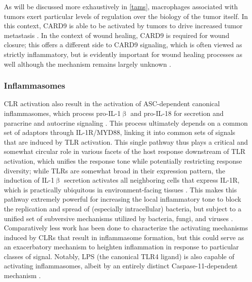 As will be discussed more exhaustively in \autoref{tams}, macrophages associated with tumors exert particular levels of regulation over the biology of the tumor itself. In this context, CARD9 is able to be activated by tumors to drive increased tumor metastasis \citep{Yang2014b}. In the context of wound healing, CARD9 is required for wound closure; this offers a different side to CARD9 signaling, which is often viewed as strictly inflammatory, but is evidently important for wound healing processes as well although the mechanism remains largely unknown \citep{Kanno2017}.

\subsubsection{Inflammasomes}\label{clr:asc}

CLR activation also result in the activation of ASC\hyp{}dependent canonical inflammasomes, which process pro\hyp{}IL\hyp{}1$\upbeta$ and pro\hyp{}IL\hyp{}18 for secretion and paracrine and autocrine signaling \citep{Gross2011}. This process ultimately depends on a common set of adaptors through IL\hyp{}1R/MYD88, linking it into common sets of signals that are induced by TLR activation. This single pathway thus plays a critical and somewhat circular role in various facets of the host response downstream of TLR activation, which unifies the response tone while potentially restricting response diversity; while TLRs are somewhat broad in their expression pattern, the induction of IL\hyp{}1$\upbeta$ secretion activates all neighboring cells that express IL\hyp{}1R, which is practically ubiquitous in environment\hyp{}facing tissues \citep{Deyerle1992, Malik2018}. This makes this pathway extremely powerful for increasing the local inflammatory tone to block the replication and spread of (especially intracellular) bacteria, but subject to a unified set of subversive mechanisms utilized by bacteria, fungi, and viruses \citep{Wein2022, MacMicking2012}. Comparatively less work has been done to characterize the activating mechanisms induced by CLRs that result in inflammasome formation, but this could serve as an exacerbatory mechanism to heighten inflammation in response to particular classes of signal. Notably, LPS (the canonical TLR4 ligand) is also capable of activating inflammasomes, albeit by an entirely distinct Caspase\hyp{}11\hyp{}dependent mechanism \citep{Hagar2013, Vanaja2016, Pilla2014, Finethy2020}.

